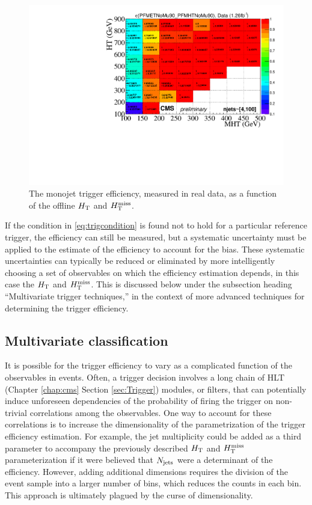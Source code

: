 \begin{figure}[tb!]
  \begin{center}
    \includegraphics[width=0.95\linewidth]{figures/trigger/MonojetTrigger_EfficiencyData.pdf}
    \caption{
      The monojet trigger efficiency, measured in real data, as a function of the offline $H_{\rm T}$
      and $H_{\text{T}}^{\rm miss}$. }
    \label{fig:2dMonoEff}
  \end{center}
\end{figure}


If the condition in \ref{eq:trigcondition} is found not to hold for a particular reference trigger, the efficiency can still be measured, but a systematic uncertainty must be applied to the estimate of the efficiency to account for the bias. These systematic uncertainties can typically be reduced or eliminated by more intelligently choosing a set of observables on which the efficiency estimation depends, in this case the $H_{\rm T}$ and $H_{\text{T}}^{\rm miss}$. This is discussed below under the subsection heading ``Multivariate trigger techniques,'' in the context of more advanced techniques for determining the trigger efficiency. 
 \FloatBarrier
 
\subsection{Multivariate classification}
\label{sec:mvatrigger}
It is possible for the trigger efficiency to vary as a complicated function of the observables in events. Often, a trigger decision involves a long chain of HLT (Chapter \ref{chap:cms} Section \ref{sec:Trigger}) modules, or filters, that can potentially induce unforeseen dependencies of the probability of firing the trigger on non-trivial correlations among the observables. One way to account for these correlations is to increase the dimensionality of the parametrization of the trigger efficiency estimation. For example, the jet multiplicity could be added as a third parameter to accompany the previously described $H_{\rm T}$ and $H_{\text{T}}^{\rm miss}$ parameterization if it were believed that $N_{\rm jets}$ were a determinant of the efficiency. However, adding additional dimensions requires the division of the event sample into a larger number of bins, which reduces the counts in each bin. This approach is ultimately plagued by the curse of dimensionality.

